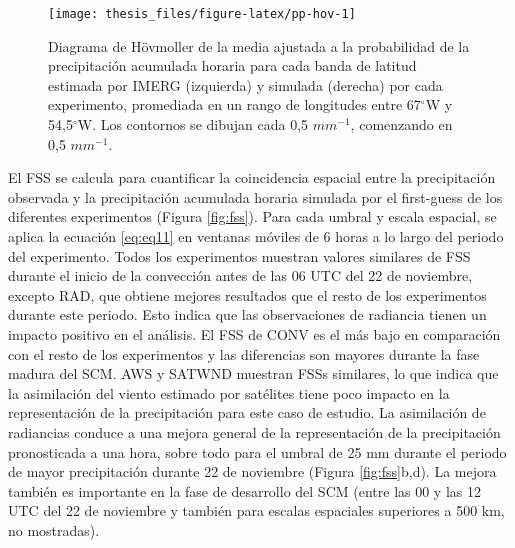 \documentclass[12pt,oneside]{reedthesis}
\begin{document}
\begin{figure}

{\centering \texttt{[image: thesis\_files/figure-latex/pp-hov-1]} 

}

\caption{Diagrama de Hövmoller de la media ajustada a la probabilidad de la precipitación acumulada horaria para cada banda de latitud estimada por IMERG (izquierda) y simulada (derecha) por cada experimento, promediada en un rango de longitudes entre 67\(^{\circ}\)W y 54,5\(^{\circ}\)W. Los contornos se dibujan cada 0,5 \(mm^{-1}\), comenzando en 0,5 \(mm^{-1}\).}\label{fig:pp-hov}
\end{figure}
El FSS se calcula para cuantificar la coincidencia espacial entre la precipitación observada y la precipitación acumulada horaria simulada por el first-guess de los diferentes experimentos (Figura \ref{fig:fss}). Para cada umbral y escala espacial, se aplica la ecuación \eqref{eq:eq11} en ventanas móviles de 6 horas a lo largo del periodo del experimento. Todos los experimentos muestran valores similares de FSS durante el inicio de la convección antes de las 06 UTC del 22 de noviembre, excepto RAD, que obtiene mejores resultados que el resto de los experimentos durante este periodo. Esto indica que las observaciones de radiancia tienen un impacto positivo en el análisis. El FSS de CONV es el más bajo en comparación con el resto de los experimentos y las diferencias son mayores durante la fase madura del SCM. AWS y SATWND muestran FSSs similares, lo que indica que la asimilación del viento estimado por satélites tiene poco impacto en la representación de la precipitación para este caso de estudio. La asimilación de radiancias conduce a una mejora general de la representación de la precipitación pronosticada a una hora, sobre todo para el umbral de 25 mm durante el periodo de mayor precipitación durante 22 de noviembre (Figura \ref{fig:fss}b,d). La mejora también es importante en la fase de desarrollo del SCM (entre las 00 y las 12 UTC del 22 de noviembre y también para escalas espaciales superiores a 500 km, no mostradas).
\end{document}
